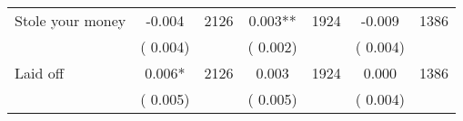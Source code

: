 \begin{tabular}{l*{6}{c}}
Stole your money        &             -0.004      &       2126       &              0.003**      &       1924       &             -0.009      &       1386       \\
                       &       (       0.004)            &                               &       (       0.002)            &                               &       (       0.004)            &                               \\
Laid off        &              0.006*      &       2126       &              0.003      &       1924       &              0.000      &       1386       \\
                       &       (       0.005)            &                               &       (       0.005)            &                               &       (       0.004)            &                               \\
\hline \end{tabular}